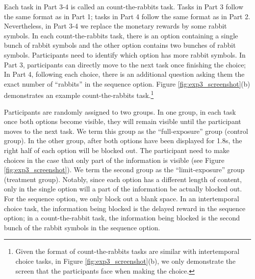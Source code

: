 \documentclass[
  12pt,
]{article}
\begin{document}
Each task in Part 3-4 is called an count-the-rabbits task. Tasks in Part
3 follow the same format as in Part 1; tasks in Part 4 follow the same
format as in Part 2. Nevertheless, in Part 3-4 we replace the monetary
rewards by some rabbit symbols. In each count-the-rabbits task, there is
an option containing a single bunch of rabbit symbols and the other
option contains two bunches of rabbit symbols. Participants need to
identify which option has more rabbit symbols. In Part 3, participants
can directly move to the next task once finishing the choice; In Part 4,
following each choice, there is an additional question asking them the
exact number of ``rabbits'' in the sequence option. Figure
\ref{fig:exp3_screenshot}(b) demonstrates an example count-the-rabbits
task.\footnote{Given the format of count-the-rabbits tasks are similar
  with intertemporal choice tasks, in Figure
  \ref{fig:exp3_screenshot}(b), we only demonstrate the screen that the
  participants face when making the choice.}

Participants are randomly assigned to two groups. In one group, in each
task once both options become visible, they will remain visible until
the participant moves to the next task. We term this group as the
``full-exposure'' group (control group). In the other group, after both
options have been displayed for 1.8s, the right half of each option will
be blocked out. The participant need to make choices in the case that
only part of the information is visible (see Figure
\ref{fig:exp3_screenshot}). We term the second group as the
``limit-exposure'' group (treatment group). Notably, since each option
has a different length of content, only in the single option will a part
of the information be actually blocked out. For the sequence option, we
only block out a blank space. In an intertemporal choice task, the
information being blocked is the delayed reward in the sequence option;
in a count-the-rabbit task, the information being blocked is the second
bunch of the rabbit symbols in the sequence option.
\end{document}
